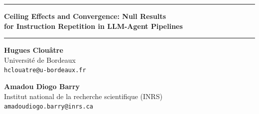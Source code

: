 \documentclass[11pt,a4paper]{article}
\begin{document}
\hrule height 4pt
\vskip 4mm
\begin{center}
{\LARGE\bfseries Ceiling Effects and Convergence: Null Results\\for Instruction Repetition in LLM-Agent Pipelines\par}
\vskip 4mm
\hrule height 1pt
\vskip 5mm
\small
\begin{minipage}[t]{0.44\textwidth}
\centering
\textbf{Hugues Clouâtre}\\[4pt]Université de Bordeaux\\\texttt{hclouatre@u-bordeaux.fr}
\end{minipage}
\hfill
\begin{minipage}[t]{0.54\textwidth}
\centering
\textbf{Amadou Diogo Barry}\\[4pt]Institut national de la recherche scientifique (INRS)\\\texttt{amadoudiogo.barry@inrs.ca}
\end{minipage}
\normalsize
\end{center}
\vskip 8mm

\begin{abstract}
\vspace{3mm}
\textbf{Context:} Prompt repetition is the verbatim duplication of an input, so that one copy of a query becomes two.
It improves accuracy for non-reasoning large language models (LLMs) on retrieval and multiple-choice benchmarks.
\textbf{Objective:} We ask whether non-reasoning LLM agents in multi-step pipelines gain task success from a verbatim second copy of their instructions, and whether the answer depends on the model.
\textbf{Method:} Four exploratory pilot experiments, each with one model, five runs per condition and a single unvalidated LLM judge, motivated a pre-registered confirmatory experiment.
It ran two Claude Haiku generations with 20 runs per arm and model, an executable 0-to-3 score and a protocol deposited before the first run.
\textbf{Results:} After ten exclusions under the pre-registered exclusion rule, the rank-biserial effect of repetition is 0.17 for one generation and $-0.01$ for the other; both 95\% bootstrap intervals include zero.
\textbf{Conclusions:} We find no effect for either model, and the all-runs reading agrees.
The pilots add a documented rubric-runner co-design failure and the containment requirements that made the confirmatory run possible.
All data are open.
\end{abstract}

\vspace{4mm}
\end{document}
